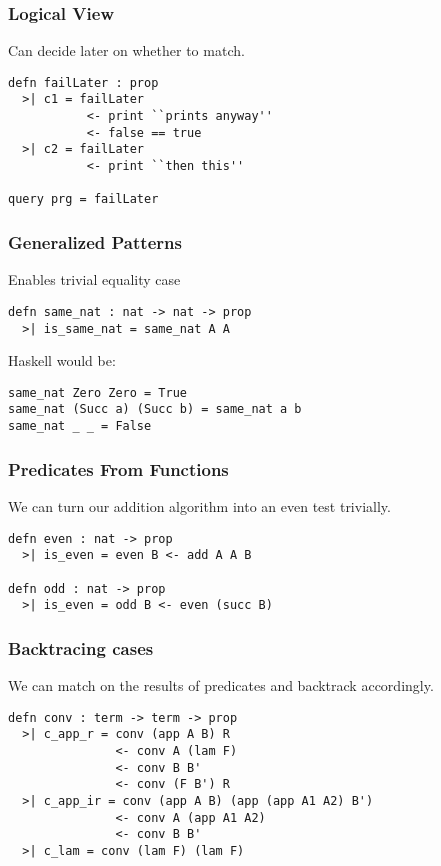 
\begin{frame}[fragile]
\frametitle{Logical View}

Can decide later on whether to match.

\begin{lstlisting}
defn failLater : prop 
  >| c1 = failLater 
           <- print ``prints anyway'' 
           <- false == true
  >| c2 = failLater
           <- print ``then this''

query prg = failLater
\end{lstlisting}
\end{frame}


\begin{frame}[fragile]
\frametitle{Generalized Patterns}

Enables trivial equality case

\begin{lstlisting}
defn same_nat : nat -> nat -> prop
  >| is_same_nat = same_nat A A
\end{lstlisting}

Haskell would be: 

\begin{lstlisting}
same_nat Zero Zero = True
same_nat (Succ a) (Succ b) = same_nat a b
same_nat _ _ = False
\end{lstlisting}
\end{frame}


\begin{frame}[fragile]
\frametitle{Predicates From Functions}

We can turn our addition algorithm into an even test trivially.

\begin{lstlisting}
defn even : nat -> prop
  >| is_even = even B <- add A A B

defn odd : nat -> prop
  >| is_even = odd B <- even (succ B)
\end{lstlisting}
\end{frame}


\begin{frame}[fragile]
\frametitle{Backtracing cases}

We can match on the results of predicates and backtrack accordingly.

\begin{lstlisting}
defn conv : term -> term -> prop
  >| c_app_r = conv (app A B) R
               <- conv A (lam F)
               <- conv B B'
               <- conv (F B') R
  >| c_app_ir = conv (app A B) (app (app A1 A2) B')
               <- conv A (app A1 A2)
               <- conv B B'
  >| c_lam = conv (lam F) (lam F) 
\end{lstlisting}
\end{frame}

